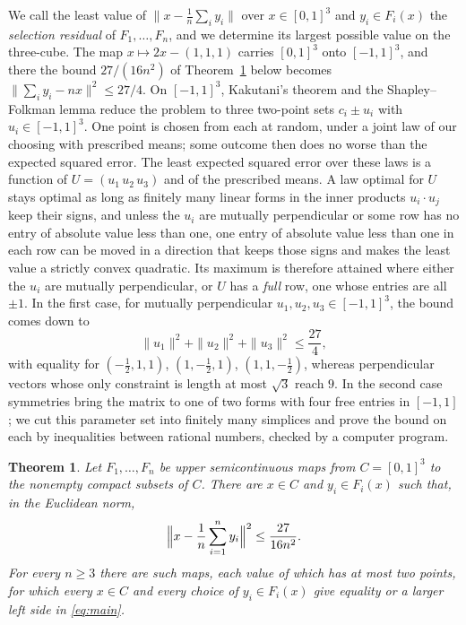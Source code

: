 \documentclass[11pt]{amsart}
\newtheorem{thm}{Theorem}[section]
\theoremstyle{remark}
\numberwithin{equation}{section}
\begin{document}
We call the least value of $\|x-\frac1n\sum_iy_i\|$ over $x\in[0,1]^3$ and $y_i\in F_i(x)$ the \emph{selection residual} of $F_1,\dots,F_n$, and we determine its largest possible value on the three-cube. The map $x\mapsto2x-(1,1,1)$ carries $[0,1]^3$ onto $[-1,1]^3$, and there the bound $27/(16n^2)$ of Theorem~\ref{thm:main} below becomes $\|\sum_iy_i-nx\|^2\le27/4$. On $[-1,1]^3$, Kakutani's theorem and the Shapley--Folkman lemma reduce the problem to three two-point sets $c_i\pm u_i$ with $u_i\in[-1,1]^3$. One point is chosen from each at random, under a joint law of our choosing with prescribed means; some outcome then does no worse than the expected squared error. The least expected squared error over these laws is a function of $U=(u_1\,u_2\,u_3)$ and of the prescribed means. A law optimal for $U$ stays optimal as long as finitely many linear forms in the inner products $u_i\cdot u_j$ keep their signs, and unless the $u_i$ are mutually perpendicular or some row has no entry of absolute value less than one, one entry of absolute value less than one in each row can be moved in a direction that keeps those signs and makes the least value a strictly convex quadratic. Its maximum is therefore attained where either the $u_i$ are mutually perpendicular, or $U$ has a \emph{full} row, one whose entries are all $\pm1$. In the first case, for mutually perpendicular $u_1,u_2,u_3\in[-1,1]^3$, the bound comes down to
\[
\|u_1\|^2+\|u_2\|^2+\|u_3\|^2\le\frac{27}4,
\]
with equality for $(-\frac12,1,1)$, $(1,-\frac12,1)$, $(1,1,-\frac12)$, whereas perpendicular vectors whose only constraint is length at most $\sqrt3$ reach $9$. In the second case symmetries bring the matrix to one of two forms with four free entries in $[-1,1]$; we cut this parameter set into finitely many simplices and prove the bound on each by inequalities between rational numbers, checked by a computer program.

\begin{thm}\label{thm:main}
Let $F_1,\dots,F_n$ be upper semicontinuous maps from $C=[0,1]^3$ to the nonempty compact subsets of $C$. There are $x\in C$ and $y_i\in F_i(x)$ such that, in the Euclidean norm,
\begin{equation}\label{eq:main}
\Bigl\|x-\frac1n\sum_{i=1}^n y_i\Bigr\|^2\le\frac{27}{16n^2}.
\end{equation}
For every $n\ge3$ there are such maps, each value of which has at most two points, for which every $x\in C$ and every choice of $y_i\in F_i(x)$ give equality or a larger left side in \eqref{eq:main}.
\end{thm}
\end{document}
